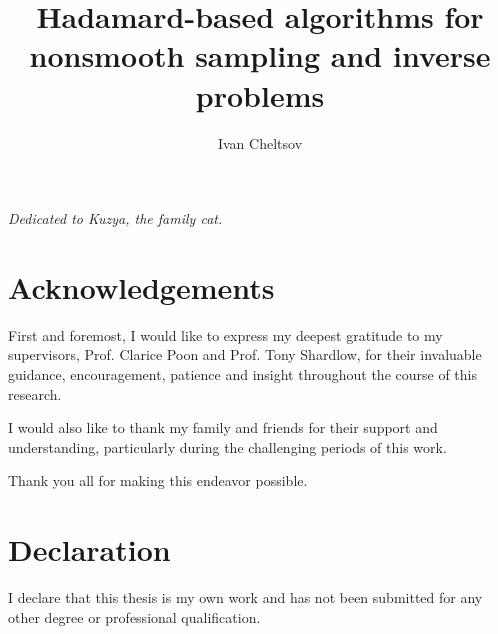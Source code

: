 \documentclass[11pt, twoside]{report}
\title{Hadamard-based algorithms for nonsmooth sampling and inverse problems}
\author{Ivan Cheltsov}
\begin{document}
\maketitle
\clearpage
\thispagestyle{empty} %
\begin{center}
    \textit{Dedicated to Kuzya, the family cat.}
\end{center}

\clearpage
\chapter*{Acknowledgements}

First and foremost, I would like to express my deepest gratitude to my supervisors, Prof. Clarice Poon and Prof. Tony Shardlow, for their invaluable guidance, encouragement, patience and insight throughout the course of this research.  

I would also like to thank my family and friends for their support and understanding, particularly during the challenging periods of this work.

Thank you all for making this endeavor possible.

\clearpage
\chapter*{Declaration}
I declare that this thesis is my own work and has not been submitted for any other degree or professional qualification.\\
\end{document}
